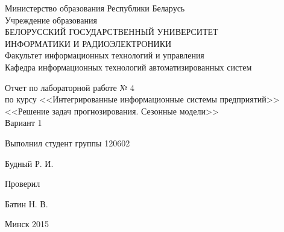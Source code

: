\thispagestyle{empty}
\setlength{\parindent}{0ex} %

\begin{center}
  Министерство образования Республики Беларусь \\
  \vspace{0.5ex}
  Учреждение образования \\
  БЕЛОРУССКИЙ ГОСУДАРСТВЕННЫЙ УНИВЕРСИТЕТ \\
  ИНФОРМАТИКИ И РАДИОЭЛЕКТРОНИКИ \\
  \vspace{0.5ex}
  Факультет информационных технологий и управления \\
  \vspace{0.5ex}
  Кафедра информационных технологий автоматизированных систем
\end{center}

\vspace{50mm}

\begin{center}
  Отчет по лабораторной работе № 4 \\
  по курсу <<Интегрированные информационные системы предприятий>> \\
  <<Решение задач прогнозирования. Сезонные модели>> \\
  Вариант 1
\end{center}

\vspace{40mm}

\begin{minipage}{.55\linewidth}
    Выполнил студент группы 120602
\end{minipage}
\hfill
\begin{minipage}{.4\linewidth}
  \begin{flushright}
    Будный Р. И.
  \end{flushright}
\end{minipage}

\begin{minipage}{.55\linewidth}
    Проверил
\end{minipage}
\hfill
\begin{minipage}{.4\linewidth}
  \begin{flushright}
    Батин Н. В.
  \end{flushright}
\end{minipage}

\vspace{55mm}
\begin{center}
  Минск 2015
\end{center}

\setlength{\parindent}{5ex} %

\newpage
